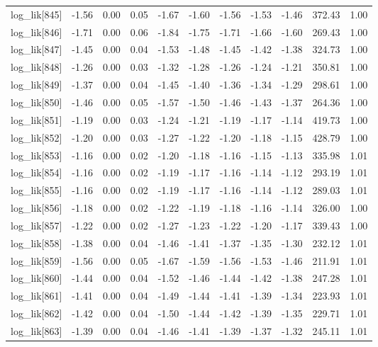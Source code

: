 \begin{table}[ht]
\begin{tabular}{rrrrrrrrrrr}
  log\_lik[845] & -1.56 & 0.00 & 0.05 & -1.67 & -1.60 & -1.56 & -1.53 & -1.46 & 372.43 & 1.00 \\ 
  log\_lik[846] & -1.71 & 0.00 & 0.06 & -1.84 & -1.75 & -1.71 & -1.66 & -1.60 & 269.43 & 1.00 \\ 
  log\_lik[847] & -1.45 & 0.00 & 0.04 & -1.53 & -1.48 & -1.45 & -1.42 & -1.38 & 324.73 & 1.00 \\ 
  log\_lik[848] & -1.26 & 0.00 & 0.03 & -1.32 & -1.28 & -1.26 & -1.24 & -1.21 & 350.81 & 1.00 \\ 
  log\_lik[849] & -1.37 & 0.00 & 0.04 & -1.45 & -1.40 & -1.36 & -1.34 & -1.29 & 298.61 & 1.00 \\ 
  log\_lik[850] & -1.46 & 0.00 & 0.05 & -1.57 & -1.50 & -1.46 & -1.43 & -1.37 & 264.36 & 1.00 \\ 
  log\_lik[851] & -1.19 & 0.00 & 0.03 & -1.24 & -1.21 & -1.19 & -1.17 & -1.14 & 419.73 & 1.00 \\ 
  log\_lik[852] & -1.20 & 0.00 & 0.03 & -1.27 & -1.22 & -1.20 & -1.18 & -1.15 & 428.79 & 1.00 \\ 
  log\_lik[853] & -1.16 & 0.00 & 0.02 & -1.20 & -1.18 & -1.16 & -1.15 & -1.13 & 335.98 & 1.01 \\ 
  log\_lik[854] & -1.16 & 0.00 & 0.02 & -1.19 & -1.17 & -1.16 & -1.14 & -1.12 & 293.19 & 1.01 \\ 
  log\_lik[855] & -1.16 & 0.00 & 0.02 & -1.19 & -1.17 & -1.16 & -1.14 & -1.12 & 289.03 & 1.01 \\ 
  log\_lik[856] & -1.18 & 0.00 & 0.02 & -1.22 & -1.19 & -1.18 & -1.16 & -1.14 & 326.00 & 1.00 \\ 
  log\_lik[857] & -1.22 & 0.00 & 0.02 & -1.27 & -1.23 & -1.22 & -1.20 & -1.17 & 339.43 & 1.00 \\ 
  log\_lik[858] & -1.38 & 0.00 & 0.04 & -1.46 & -1.41 & -1.37 & -1.35 & -1.30 & 232.12 & 1.01 \\ 
  log\_lik[859] & -1.56 & 0.00 & 0.05 & -1.67 & -1.59 & -1.56 & -1.53 & -1.46 & 211.91 & 1.01 \\ 
  log\_lik[860] & -1.44 & 0.00 & 0.04 & -1.52 & -1.46 & -1.44 & -1.42 & -1.38 & 247.28 & 1.01 \\ 
  log\_lik[861] & -1.41 & 0.00 & 0.04 & -1.49 & -1.44 & -1.41 & -1.39 & -1.34 & 223.93 & 1.01 \\ 
  log\_lik[862] & -1.42 & 0.00 & 0.04 & -1.50 & -1.44 & -1.42 & -1.39 & -1.35 & 229.71 & 1.01 \\ 
  log\_lik[863] & -1.39 & 0.00 & 0.04 & -1.46 & -1.41 & -1.39 & -1.37 & -1.32 & 245.11 & 1.01 \\ 

\end{tabular}
\end{table}

